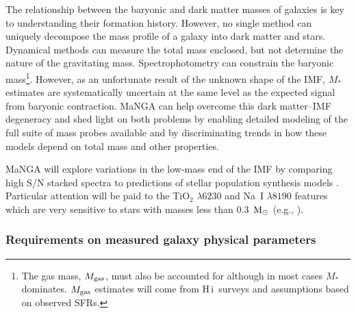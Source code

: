 \documentclass[preprint,11pt]{aastex}
\newcommand{\Msun}{{\rm M}_{\odot}}
\newcommand{\HI}{{\sc H\,i}}
\begin{document}
The relationship between the baryonic and dark matter masses of
galaxies is key to understanding their formation history. However, no
single method can uniquely decompose the mass profile of a galaxy into
dark matter and stars. Dynamical methods can measure the total mass
enclosed, but not determine the nature of the gravitating mass.
Spectrophotometry can constrain the baryonic mass\footnote{The gas
  mass, $M_{\rm gas}$, must also be accounted for although in most
  cases $M_*$ dominates. $M_{\rm gas}$ estimates will come from \HI\
  surveys and assumptions based on observed SFRs.}. However, as an
unfortunate result of the unknown shape of the IMF, $M_*$ estimates
are systematically uncertain at the same level as the expected signal
from baryonic contraction. MaNGA can help overcome this dark
matter--IMF degeneracy and shed light on both problems by enabling
detailed modeling of the full suite of mass probes available and by
discriminating trends in how these models depend on total mass and
other properties.

MaNGA will explore variations in the low-mass end of the IMF by
comparing high S/N stacked spectra to predictions of stellar
population synthesis models \citep{conroy2012}.  Particular
attention will be paid to the TiO$_2$ $\lambda6230$ and Na~I
$\lambda8190$ features which are very sensitive to stars with masses
less than 0.3~$\Msun$ (e.g., \citealt{spiniello2012}).


\subsubsection{Requirements on measured galaxy physical parameters}
\end{document}
